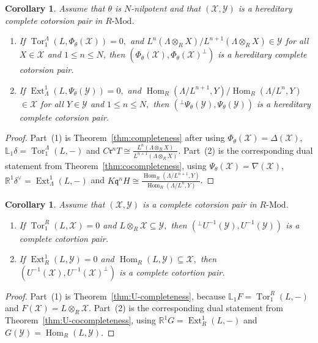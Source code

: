 \documentclass[11pt,reqno]{amsart}
\numberwithin{equation}{section}
\newtheorem{corollary}[theorem]{Corollary}
\newcommand{\cX}{\mathcal X}
\newcommand{\cY}{\mathcal Y}
\newcommand{\Ext}{\operatorname{Ext}}
\newcommand{\Hom}{\operatorname{Hom}}
\newcommand{\Tor}{\operatorname{Tor}}
\newcommand{\radf}{\mathfrak r}
\newcommand{\coradf}{\mathfrak q}
\begin{document}
\begin{corollary}\label{cor:theta-completeness}
Assume that $\theta$ is $N$-nilpotent and that $(\cX,\cY)$ is a hereditary complete cotorsion pair in $R\text{-Mod}$.
\begin{enumerate}[label=\textup{(\arabic*)}]
\item If
$
\Tor_1^\Lambda(L,\Phi_\theta(\cX))=0,$ and
$
{L^n(\Lambda\otimes_RX)}/{L^{n+1}(\Lambda\otimes_RX)}\in\cY$ for all $X\in \cX$ and $1\le n\le N$,
then $(\Phi_\theta(\cX),\Phi_\theta(\cX)^\perp)$ is a hereditary complete cotorsion pair.
\item If
$
\Ext_\Lambda^1(L,\Psi_\theta(\cY))=0,$ and
${\Hom_R(\Lambda/L^{n+1},Y)}/{\Hom_R(\Lambda/L^n,Y)}$ $\in \cX$ for all $Y\in \cY$ and $1\le n\le N,$
then $({}^\perp\Psi_\theta(\cY),\Psi_\theta(\cY))$ is a hereditary complete cotorsion pair.
\end{enumerate}
\end{corollary}
\begin{proof}
Part~(1) is Theorem~\ref{thm:completeness} after using $\Phi_\theta(\cX)=\Delta(\cX)$, $\mathbb{L}_1\delta=\Tor_1^\Lambda(L,-)$ and $C\radf^nT\cong \frac{L^n(\Lambda\otimes_RX)}{L^{n+1}(\Lambda\otimes_RX)}$. Part~(2) is the corresponding dual statement from Theorem~\ref{thm:cocompleteness}, using $\Psi_\theta(\cX)=\nabla(\cX)$, $\mathbb{R}^1\delta^\vee=\Ext_\Lambda^1(L,-)$ and $K\coradf^nH\cong \frac{\Hom_R(\Lambda/L^{n+1},Y)}
     {\Hom_R(\Lambda/L^n,Y)}$.
\end{proof}

\begin{corollary}\label{cor:theta-U-completeness}
Assume that $(\cX,\cY)$ is a complete cotorsion pair in $R\text{-Mod}$.
\begin{enumerate}[label=\textup{(\arabic*)}]
\item If $\Tor_1^R(L,\cX)=0$ and
$
L\otimes_R\cX\subseteq\cY,
$
then $({}^\perp U^{-1}(\cY),U^{-1}(\cY))$ is a complete cotortion pair.
\item If $\Ext_R^1(L,\cY)=0$ and
$
\Hom_R(L,\cY)\subseteq\cX,
$
then $(U^{-1}(\cX),U^{-1}(\cX)^\perp)$ is a complete cotortion pair.
\end{enumerate}
\end{corollary}
\begin{proof}
Part~(1) is Theorem~\ref{thm:U-completeness}, because $\mathbb{L}_1F=\Tor_1^R(L,-)$ and $F(\cX)=L\otimes_R\cX$. Part~(2) is the corresponding dual statement from Theorem~\ref{thm:U-cocompleteness}, using $\mathbb{R}^1G=\Ext_R^1(L,-)$ and $G(\cY)=\Hom_R(L,\cY)$.
\end{proof}
\end{document}
